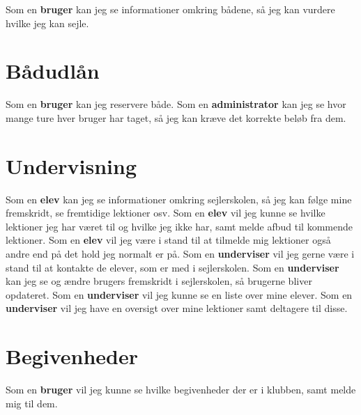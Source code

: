 Som en \textbf{bruger} kan jeg se informationer omkring bådene, så jeg kan vurdere hvilke jeg kan sejle. 

\section{Bådudlån}

Som en \textbf{bruger} kan jeg reservere både.
\newline
Som en \textbf{administrator} kan jeg se hvor mange ture hver bruger har taget, så jeg kan kræve det korrekte beløb fra dem.

\section{Undervisning}
Som en \textbf{elev} kan jeg se informationer omkring sejlerskolen, så jeg kan følge mine fremskridt, se fremtidige lektioner osv. 
\newline
Som en \textbf{elev} vil jeg kunne se hvilke lektioner jeg har været til og hvilke jeg ikke har, samt melde afbud til kommende lektioner.
\newline
Som en \textbf{elev} vil jeg være i stand til at tilmelde mig lektioner også andre end på det hold jeg normalt er på.
\newline
Som en \textbf{underviser} vil jeg gerne være i stand til at kontakte de elever, som er med i sejlerskolen.
\newline
Som en \textbf{underviser} kan jeg se og ændre brugers fremskridt i sejlerskolen, så brugerne bliver opdateret.
\newline
Som en \textbf{underviser} vil jeg kunne se en liste over mine elever.
\newline
Som en \textbf{underviser} vil jeg have en oversigt over mine lektioner samt deltagere til disse.

\section{Begivenheder}
Som en \textbf{bruger} vil jeg kunne se hvilke begivenheder der er i klubben, samt melde mig til dem.

